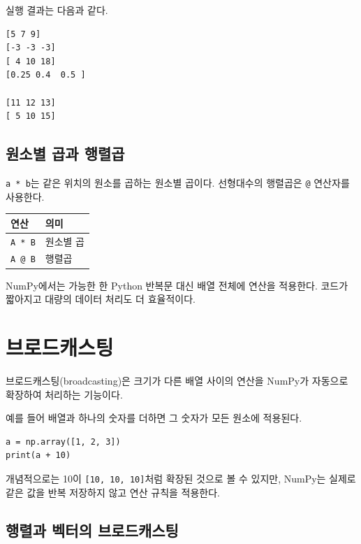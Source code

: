 \documentclass[11pt,a4paper]{article}
\begin{document}
실행 결과는 다음과 같다.

\begin{verbatim}
[5 7 9]
[-3 -3 -3]
[ 4 10 18]
[0.25 0.4  0.5 ]

[11 12 13]
[ 5 10 15]
\end{verbatim}

\subsection{원소별 곱과 행렬곱}

\texttt{a * b}는 같은 위치의 원소를 곱하는 원소별 곱이다. 선형대수의 행렬곱은 \texttt{@} 연산자를 사용한다.

\begin{center}
\begin{tabular}{ll}
\toprule
연산 & 의미 \\
\midrule
\texttt{A * B} & 원소별 곱 \\
\texttt{A @ B} & 행렬곱 \\
\bottomrule
\end{tabular}
\end{center}

\begin{importantbox}
NumPy에서는 가능한 한 Python 반복문 대신 배열 전체에 연산을 적용한다. 코드가 짧아지고 대량의 데이터 처리도 더 효율적이다.
\end{importantbox}

\section{브로드캐스팅}

브로드캐스팅(broadcasting)은 크기가 다른 배열 사이의 연산을 NumPy가 자동으로 확장하여 처리하는 기능이다.

예를 들어 배열과 하나의 숫자를 더하면 그 숫자가 모든 원소에 적용된다.

\begin{lstlisting}
a = np.array([1, 2, 3])
print(a + 10)
\end{lstlisting}

개념적으로는 10이 \texttt{[10, 10, 10]}처럼 확장된 것으로 볼 수 있지만, NumPy는 실제로 같은 값을 반복 저장하지 않고 연산 규칙을 적용한다.

\subsection{행렬과 벡터의 브로드캐스팅}
\end{document}
